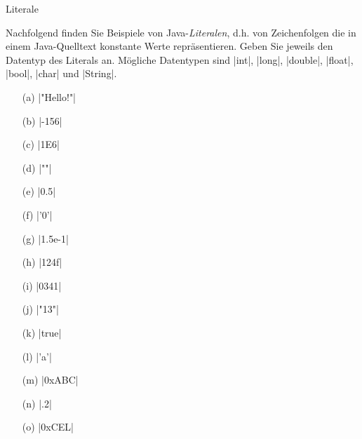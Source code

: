 \begin{exercise}{Literale}

\begin{body}
Nachfolgend finden Sie Beispiele von Java-\emph{Literalen}, d.h. von Zeichenfolgen die in einem Java-Quelltext konstante Werte repräsentieren. Geben Sie jeweils den Datentyp des Literals an. Mögliche Datentypen sind
\code|int|, \code|long|, \code|double|, \code|float|, \code|bool|, \code|char| und \code|String|.
\begin{center}
\begin{minipage}{0.3\textwidth}
\begin{itemize}
\item[(a)] \code|"Hello!"|
\item[(b)] \code|-156|
\item[(c)] \code|1E6|
\item[(d)] \code|""|
\item[(e)] \code|0.5|
\end{itemize}
\end{minipage}
\begin{minipage}{0.3\textwidth}
\begin{itemize}
\item[(f)] \code|'0'|
\item[(g)] \code|1.5e-1|
\item[(h)] \code|124f|
\item[(i)] \code|0341|
\item[(j)] \code|"13"|
\end{itemize}
\end{minipage}
\begin{minipage}{0.3\textwidth}
\begin{itemize}
\item[(k)] \code|true|
\item[(l)] \code|'a'|
\item[(m)] \code|0xABC|
\item[(n)] \code|.2|
\item[(o)] \code|0xCEL|
\end{itemize}
\end{minipage}
\end{center}
\end{body}


\end{exercise}
